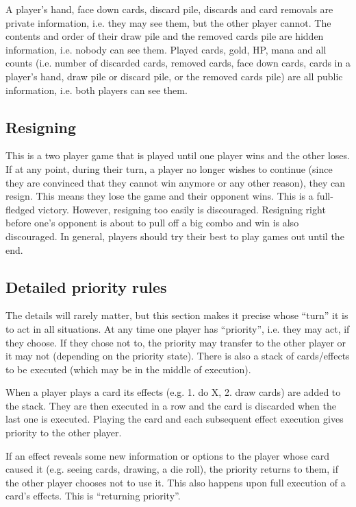 \documentclass[dvipsnames,parskip,a4paper]{scrartcl}
\begin{document}
A player's hand, face down cards, discard pile, discards and card removals are private information, i.e. they may see them, but the other player cannot. The contents and order of their draw pile and the removed cards pile are hidden information, i.e. nobody can see them. Played cards, gold, HP, mana and all counts (i.e. number of discarded cards, removed cards, face down cards, cards in a player's hand, draw pile or discard pile, or the removed cards pile) are all public information, i.e. both players can see them.

\subsection*{Resigning}

This is a two player game that is played until one player wins and the other loses. If at any point, during their turn, a player no longer wishes to continue (since they are convinced that they cannot win anymore or any other reason), they can resign. This means they lose the game and their opponent wins. This is a full-fledged victory. However, resigning too easily is discouraged. Resigning right before one's opponent is about to pull off a big combo and win is also discouraged. In general, players should try their best to play games out until the end.

\subsection*{Detailed priority rules}

The details will rarely matter, but this section makes it precise whose ``turn'' it is to act in all situations. At any time one player has ``priority'', i.e. they may act, if they choose. If they chose not to, the priority may transfer to the other player or it may not (depending on the priority state). There is also a stack of cards/effects to be executed (which may be in the middle of execution).

\vspace{4pt}

When a player plays a card its effects (e.g. 1. do X, 2. draw cards) are added to the stack. They are then executed in a row and the card is discarded when the last one is executed. Playing the card and each subsequent effect execution gives priority to the other player.

\vspace{4pt}

If an effect reveals some new information or options to the player whose card caused it (e.g. seeing cards, drawing, a die roll), the priority returns to them, if the other player chooses not to use it. This also happens upon full execution of a card's effects. This is ``returning priority''.
\end{document}
